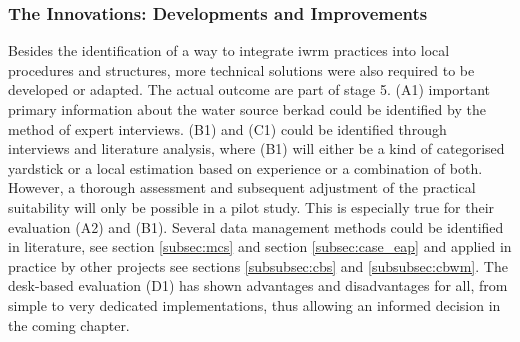 



\subsubsection{The Innovations: Developments and Improvements}

Besides the identification of a way to integrate \acrshort{iwrm} practices into local procedures and structures, more technical solutions were also required to be developed or adapted. The actual outcome are part of stage 5. (A1) important primary information about the water source berkad could be identified by the method of expert interviews. (B1) and (C1) could be identified through interviews and literature analysis, where (B1) will either be a kind of categorised yardstick or a local estimation based on experience or a combination of both. However, a thorough assessment and subsequent adjustment of the practical suitability will only be possible in a pilot study. This is especially true for their evaluation (A2) and (B1). Several data management methods could be identified in literature, see section \ref*{subsec:mcs} and section \ref{subsec:case_eap} and applied in practice by other projects see sections \ref*{subsubsec:cbs} and \ref*{subsubsec:cbwm}. The desk-based evaluation (D1) has shown advantages and disadvantages for all, from simple to very dedicated implementations, thus allowing an informed decision in the coming chapter.

